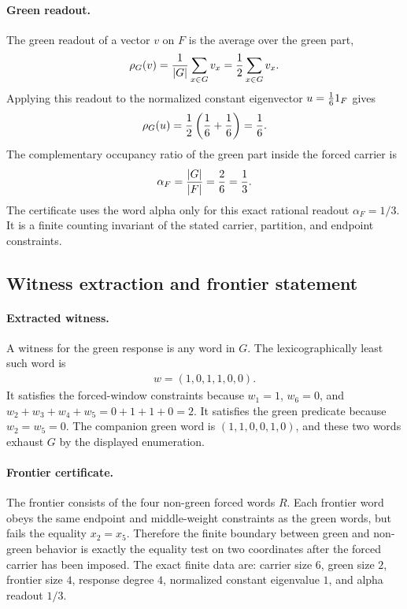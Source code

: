 \paragraph{Green readout.}
The green readout of a vector $v$ on $F$ is the average over the green part,
$$\begin{aligned}
\rho_G(v)={1\over |G|}\sum_{x\in G} v_x={1\over 2}\sum_{x\in G} v_x .
\end{aligned}$$
Applying this readout to the normalized constant eigenvector $u={1\over 6}1_F$ gives
$$\begin{aligned}
\rho_G(u)={1\over 2}\left({1\over 6}+{1\over 6}\right)={1\over 6} .
\end{aligned}$$
The complementary occupancy ratio of the green part inside the forced carrier is
$$\begin{aligned}
\alpha_F={|G|\over |F|}={2\over 6}={1\over 3} .
\end{aligned}$$
The certificate uses the word alpha only for this exact rational readout $\alpha_F=1/3$.  It is a finite counting invariant of the stated carrier, partition, and endpoint constraints.

\subsection{Witness extraction and frontier statement}\label{sec:window6-green-witness-frontier}

\paragraph{Extracted witness.}
A witness for the green response is any word in $G$.  The lexicographically least such word is
$$\begin{aligned}
w=(1,0,1,1,0,0).
\end{aligned}$$
It satisfies the forced-window constraints because $w_1=1$, $w_6=0$, and $w_2+w_3+w_4+w_5=0+1+1+0=2$.  It satisfies the green predicate because $w_2=w_5=0$.  The companion green word is $(1,1,0,0,1,0)$, and these two words exhaust $G$ by the displayed enumeration.

\paragraph{Frontier certificate.}
The frontier consists of the four non-green forced words $R$.  Each frontier word obeys the same endpoint and middle-weight constraints as the green words, but fails the equality $x_2=x_5$.  Therefore the finite boundary between green and non-green behavior is exactly the equality test on two coordinates after the forced carrier has been imposed.  The exact finite data are: carrier size $6$, green size $2$, frontier size $4$, response degree $4$, normalized constant eigenvalue $1$, and alpha readout $1/3$.

